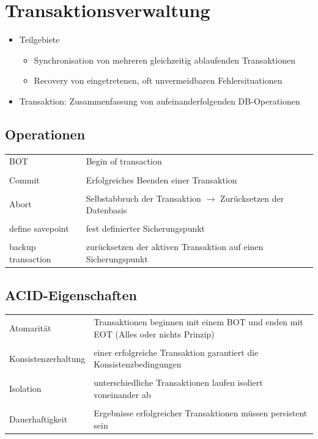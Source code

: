 \documentclass[a4paper]{article}
\begin{document}
\section{Transaktionsverwaltung}
\begin{itemize}
    \item Teilgebiete
    \begin{itemize}
        \item Synchronisation von mehreren gleichzeitig ablaufenden Transaktionen
        \item Recovery von eingetretenen, oft unvermeidbaren Fehlersituationen
    \end{itemize}
    \item Transaktion: Zusammenfassung von aufeinanderfolgenden DB-Operationen
\end{itemize}

\subsection{Operationen}
\begin{tabular}{l l}
    BOT & Begin of transaction \\
    & \\
     Commit & Erfolgreiches Beenden einer Transaktion \\
     & \\
     Abort & Selbstabbruch der Transaktion $\to$ Zurücksetzen der Datenbasis \\
     & \\
     define savepoint & fest definierter Sicherungspunkt \\
     & \\
     backup transaction & zurücksetzen der aktiven Transaktion auf einen Sicherungspunkt \\
\end{tabular}

\subsection{ACID-Eigenschaften}
\begin{tabular}{l p{12cm}}
     Atomarität &  Transaktionen beginnen mit einem BOT und enden mit EOT (Alles oder nichts Prinzip)\\
     & \\
     Konsistenzerhaltung & einer erfolgreiche Transaktion garantiert die Konsistenzbedingungen \\
     & \\
     Isolation & unterschiedliche Transaktionen laufen isoliert voneinander ab \\
     & \\
     Dauerhaftigkeit & Ergebnisse erfolgreicher Transaktionen müssen persistent sein
\end{tabular}
\end{document}
